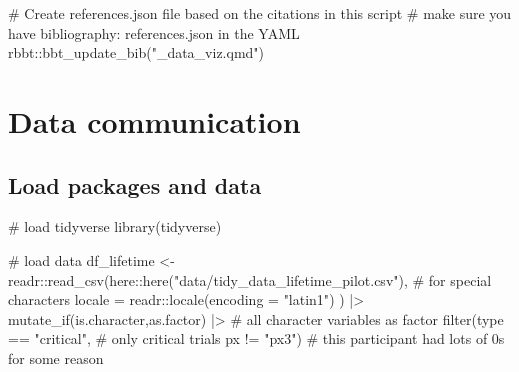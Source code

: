 \documentclass[
  letterpaper,
  DIV=11,
  numbers=noendperiod]{scrartcl}
\newenvironment{Shaded}{\begin{snugshade}}{\end{snugshade}}
\newcommand{\AttributeTok}[1]{\textcolor[rgb]{0.40,0.45,0.13}{#1}}
\newcommand{\CommentTok}[1]{\textcolor[rgb]{0.37,0.37,0.37}{#1}}
\newcommand{\FunctionTok}[1]{\textcolor[rgb]{0.28,0.35,0.67}{#1}}
\newcommand{\NormalTok}[1]{\textcolor[rgb]{0.00,0.23,0.31}{#1}}
\newcommand{\OtherTok}[1]{\textcolor[rgb]{0.00,0.23,0.31}{#1}}
\newcommand{\SpecialCharTok}[1]{\textcolor[rgb]{0.37,0.37,0.37}{#1}}
\newcommand{\StringTok}[1]{\textcolor[rgb]{0.13,0.47,0.30}{#1}}
\begin{document}
\begin{Shaded}
\begin{Highlighting}[]
\CommentTok{\# Create references.json file based on the citations in this script}
\CommentTok{\# make sure you have \textquotesingle{}bibliography: references.json\textquotesingle{} in the YAML}
\NormalTok{rbbt}\SpecialCharTok{::}\FunctionTok{bbt\_update\_bib}\NormalTok{(}\StringTok{"\_data\_viz.qmd"}\NormalTok{)}
\end{Highlighting}
\end{Shaded}

\hypertarget{data-communication}{%
\section{Data communication}\label{data-communication}}

\hypertarget{load-packages-and-data}{%
\subsection{Load packages and data}\label{load-packages-and-data}}

\begin{Shaded}
\begin{Highlighting}[]
\CommentTok{\# load tidyverse}
\FunctionTok{library}\NormalTok{(tidyverse)}

\CommentTok{\# load data}
\NormalTok{df\_lifetime }\OtherTok{\textless{}{-}}\NormalTok{ readr}\SpecialCharTok{::}\FunctionTok{read\_csv}\NormalTok{(here}\SpecialCharTok{::}\FunctionTok{here}\NormalTok{(}\StringTok{"data/tidy\_data\_lifetime\_pilot.csv"}\NormalTok{), }
                               \CommentTok{\# for special characters}
                               \AttributeTok{locale =}\NormalTok{ readr}\SpecialCharTok{::}\FunctionTok{locale}\NormalTok{(}\AttributeTok{encoding =} \StringTok{"latin1"}\NormalTok{) }
\NormalTok{                               ) }\SpecialCharTok{|\textgreater{}} 
  \FunctionTok{mutate\_if}\NormalTok{(is.character,as.factor) }\SpecialCharTok{|\textgreater{}} \CommentTok{\# all character variables as factor}
  \FunctionTok{filter}\NormalTok{(type }\SpecialCharTok{==} \StringTok{"critical"}\NormalTok{, }\CommentTok{\# only critical trials}
\NormalTok{         px }\SpecialCharTok{!=} \StringTok{"px3"}\NormalTok{) }\CommentTok{\# this participant had lots of 0\textquotesingle{}s for some reason}
\end{Highlighting}
\end{Shaded}
\end{document}
